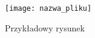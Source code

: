 \begin{figure}[htb]           %
\texttt{[image: nazwa\_pliku]} %
\caption{Przykładowy rysunek} %
\label{nazwa_rysunku}         %
\end{figure}                  %
